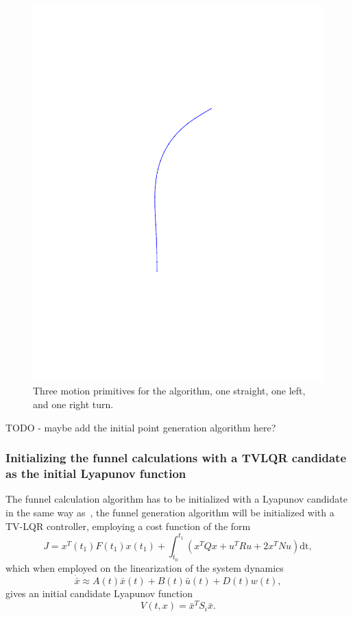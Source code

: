 \begin{figure}
\begin{minipage}[b]{0.2\textwidth}
    \includegraphics[width=\textwidth]{figures/method/right-trajector}
  \end{minipage}
  \caption{Three motion primitives for the \rrtfunnel{} algorithm, one
    straight, one left, and one right turn.}
  \label{fig:initial-trajectories}
\end{figure}

TODO - maybe add the initial point generation algorithm here?

\subsubsection{Initializing the funnel calculations with a TVLQR candidate as
  the initial Lyapunov function}

The funnel calculation algorithm has to be initialized with a Lyapunov candidate
in the same way as~\cite[Majumdar]{majumdarFunnelLibrariesRealtime2017}, the
funnel generation algorithm will be initialized with a \ac{TV-LQR} controller,
employing a cost function of the form
\begin{equation}
  J = x^{T}(t_1)F(t_1)x(t_1) + \int_{t_{0}}^{t_{1}} \left( x^{T}Qx + u^{T}Ru + 2x^TNu \right) \mathrm{dt},
\end{equation}
which when employed on the linearization of the system dynamics
\begin{equation}
  \dot{\bar{x}} \approx A(t)\bar{x}(t) + B(t)\bar{u}(t) +D(t)w(t),
\end{equation}
gives an initial candidate Lyapunov function
\begin{equation}
  V(t,x) = {\bar{x}}^{T}S_{i}\bar{x}.
\end{equation}

